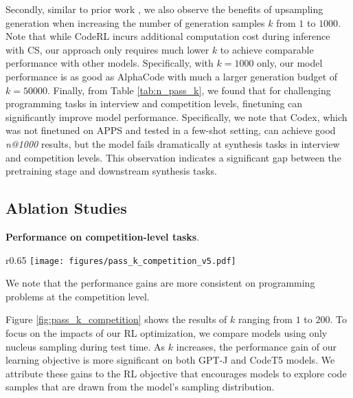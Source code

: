 \documentclass{article}
\begin{document}
Secondly, similar to prior work \cite{hendrycksapps2021, austin2021program, chen2021evaluating}, we also observe the benefits of upsampling generation when increasing the number of generation samples $k$ from $1$ to $1000$.  
Note that while CodeRL incurs additional computation cost during inference with CS, our approach only requires much lower $k$ to achieve comparable performance with other models. 
Specifically, with $k=1000$ only, our model performance is as good as AlphaCode with much a larger generation budget of $k=50000$.
Finally, from Table \ref{tab:n_pass_k}, we found that for challenging programming tasks in interview and competition levels, finetuning can significantly improve model performance. 
Specifically, we note that Codex, which was not finetuned on APPS and tested in a few-shot setting, can achieve good \emph{n@1000} results, but the model fails dramatically at synthesis tasks in interview and competition levels.
This observation indicates a significant gap between the pretraining stage and downstream synthesis tasks. 

\subsection{Ablation Studies}



\textbf{Performance on competition-level tasks}.

\newlength{\oldintextsep}
\setlength{\oldintextsep}{\intextsep}
\setlength\intextsep{0pt}
\begin{wrapfigure}{r}{0.65\textwidth}
\centering
    \texttt{[image: figures/pass\_k\_competition\_v5.pdf]}
\caption{Results on APPS competition-level test samples}
  \label{fig:pass_k_competition}
\end{wrapfigure}


We note that the performance gains are more consistent on programming problems at the competition level.

Figure \ref{fig:pass_k_competition} shows the results of $k$ ranging from $1$ to $200$. 
To focus on the impacts of our RL optimization, we compare models using only nucleus sampling during test time. 
As $k$ increases, the performance gain of our learning objective is more significant on both GPT-J and CodeT5 models.
We attribute these gains to the RL objective that encourages models to explore code samples that are drawn from the model's sampling distribution. 


\fi
\end{document}
